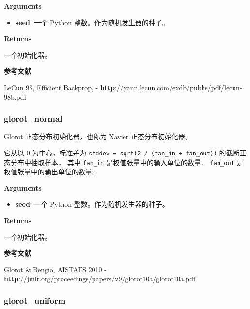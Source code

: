 \textbf{Arguments}

\begin{itemize}
\tightlist
\item
  \textbf{seed}: 一个 Python 整数。作为随机发生器的种子。
\end{itemize}

\textbf{Returns}

一个初始化器。

\textbf{参考文献}

LeCun 98, Efficient Backprop, -
\textbf{http}://yann.lecun.com/exdb/publis/pdf/lecun-98b.pdf



\subsubsection{glorot\_normal}\label{glorotux5fnormal}

\begin{Shaded}
\begin{Highlighting}[]
\OperatorTok{=}\NormalTok{)}
\end{Highlighting}
\end{Shaded}

Glorot 正态分布初始化器，也称为 Xavier 正态分布初始化器。

它从以 0 为中心，标准差为
\texttt{stddev\ =\ sqrt(2\ /\ (fan\_in\ +\ fan\_out))}
的截断正态分布中抽取样本， 其中 \texttt{fan\_in}
是权值张量中的输入单位的数量， \texttt{fan\_out}
是权值张量中的输出单位的数量。

\textbf{Arguments}

\begin{itemize}
\tightlist
\item
  \textbf{seed}: 一个 Python 整数。作为随机发生器的种子。
\end{itemize}

\textbf{Returns}

一个初始化器。

\textbf{参考文献}

Glorot \& Bengio, AISTATS 2010 -
\textbf{http}://jmlr.org/proceedings/papers/v9/glorot10a/glorot10a.pdf



\subsubsection{glorot\_uniform}\label{glorotux5funiform}

\begin{Shaded}
\begin{Highlighting}[]
\OperatorTok{=}\NormalTok{)}
\end{Highlighting}
\end{Shaded}


